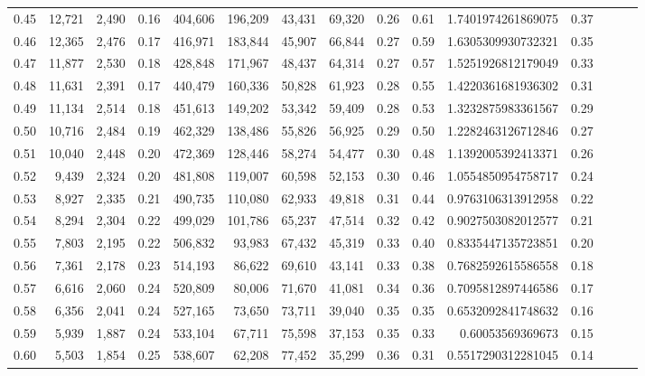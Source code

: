 \begin{tabular}{rrrrrrrrrrrrrrr}
0.45 &  12,721 &  2,490 &  0.16 &  404,606 &  196,209 &   43,431 &   69,320 &  0.26 &  0.61 &    1.7401974261869075 &      0.37 \\
0.46 &  12,365 &  2,476 &  0.17 &  416,971 &  183,844 &   45,907 &   66,844 &  0.27 &  0.59 &    1.6305309930732321 &      0.35 \\
0.47 &  11,877 &  2,530 &  0.18 &  428,848 &  171,967 &   48,437 &   64,314 &  0.27 &  0.57 &    1.5251926812179049 &      0.33 \\
0.48 &  11,631 &  2,391 &  0.17 &  440,479 &  160,336 &   50,828 &   61,923 &  0.28 &  0.55 &    1.4220361681936302 &      0.31 \\
0.49 &  11,134 &  2,514 &  0.18 &  451,613 &  149,202 &   53,342 &   59,409 &  0.28 &  0.53 &    1.3232875983361567 &      0.29 \\
0.50 &  10,716 &  2,484 &  0.19 &  462,329 &  138,486 &   55,826 &   56,925 &  0.29 &  0.50 &    1.2282463126712846 &      0.27 \\
0.51 &  10,040 &  2,448 &  0.20 &  472,369 &  128,446 &   58,274 &   54,477 &  0.30 &  0.48 &    1.1392005392413371 &      0.26 \\
0.52 &   9,439 &  2,324 &  0.20 &  481,808 &  119,007 &   60,598 &   52,153 &  0.30 &  0.46 &    1.0554850954758717 &      0.24 \\
0.53 &   8,927 &  2,335 &  0.21 &  490,735 &  110,080 &   62,933 &   49,818 &  0.31 &  0.44 &    0.9763106313912958 &      0.22 \\
0.54 &   8,294 &  2,304 &  0.22 &  499,029 &  101,786 &   65,237 &   47,514 &  0.32 &  0.42 &    0.9027503082012577 &      0.21 \\
0.55 &   7,803 &  2,195 &  0.22 &  506,832 &   93,983 &   67,432 &   45,319 &  0.33 &  0.40 &    0.8335447135723851 &      0.20 \\
0.56 &   7,361 &  2,178 &  0.23 &  514,193 &   86,622 &   69,610 &   43,141 &  0.33 &  0.38 &    0.7682592615586558 &      0.18 \\
0.57 &   6,616 &  2,060 &  0.24 &  520,809 &   80,006 &   71,670 &   41,081 &  0.34 &  0.36 &    0.7095812897446586 &      0.17 \\
0.58 &   6,356 &  2,041 &  0.24 &  527,165 &   73,650 &   73,711 &   39,040 &  0.35 &  0.35 &    0.6532092841748632 &      0.16 \\
0.59 &   5,939 &  1,887 &  0.24 &  533,104 &   67,711 &   75,598 &   37,153 &  0.35 &  0.33 &      0.60053569369673 &      0.15 \\
0.60 &   5,503 &  1,854 &  0.25 &  538,607 &   62,208 &   77,452 &   35,299 &  0.36 &  0.31 &    0.5517290312281045 &      0.14 \\

\end{tabular}
